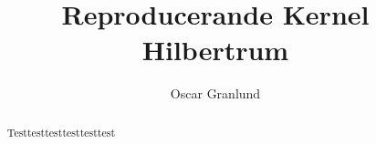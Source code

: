 \documentclass[a4paper]{report}
\title{Reproducerande Kernel Hilbertrum}
\author{Oscar Granlund}
\begin{document}
\maketitle

\begin{abstract}
	Testtesttesttesttesttest
\end{abstract}
\end{document}
